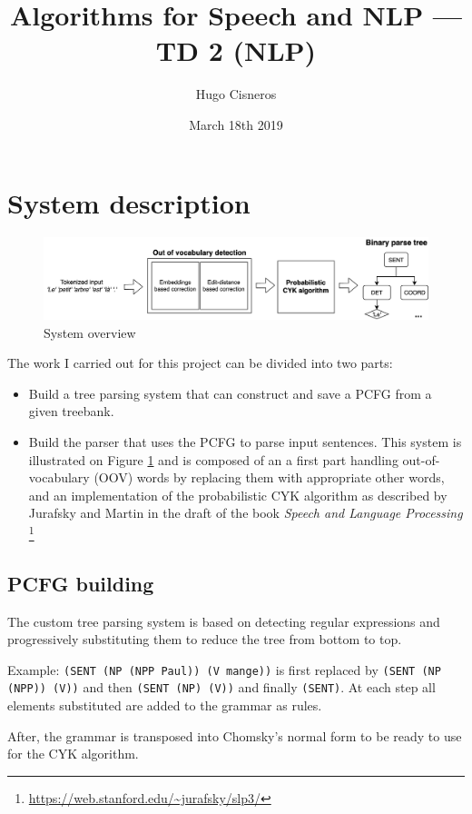 \documentclass[11pt]{article}
\title{Algorithms for Speech and NLP --- TD 2 (NLP)\vspace{-2ex}}
\author{Hugo Cisneros}
\date{March 18th 2019}
\begin{document}
    \maketitle
    \section{System description}
    \begin{figure}[h]
        \centering
        \includegraphics[width=.9\linewidth]{system.png}
        \caption{System overview}
        \label{fig:sys}
    \end{figure}
    The work I carried out for this project can be divided into two parts:
    \begin{itemize}
        \item Build a tree parsing system that can construct and save a PCFG 
        from a given treebank.
        \item Build the parser that uses the PCFG to parse input sentences. This 
        system is illustrated on Figure \ref{fig:sys} and is composed of an 
        a first part handling out-of-vocabulary (OOV) words by replacing them 
        with appropriate other words, and an implementation of the probabilistic
        CYK algorithm as described by Jurafsky and Martin in the draft of the 
        book \textit{Speech and Language Processing}
        \footnote{\url{https://web.stanford.edu/~jurafsky/slp3/}}
    \end{itemize}

    \subsection{PCFG building}
    The custom tree parsing system is based on detecting regular expressions and
    progressively substituting them to reduce the tree from bottom to top. 
    
    Example: \texttt{(SENT (NP (NPP Paul)) (V mange))} is first replaced by 
    \texttt{(SENT (NP (NPP)) (V))} and then \texttt{(SENT (NP) (V))} and finally
    \texttt{(SENT)}. At each step all elements substituted are added to the 
    grammar as rules.

    After, the grammar is transposed into Chomsky's normal form to be ready to
    use for the CYK algorithm. 
\end{document}
